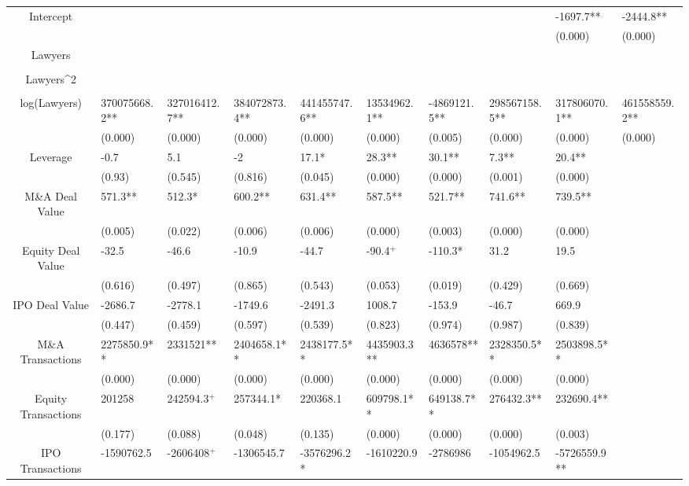 \documentclass{article}
\begin{document}
\begin{table}[H]
\begin{tabular}{|clllllllll|}
Intercept &  &  &  &  &  &  &  & -1697.7** & -2444.8** \\ 
   &  &  &  &  &  &  &  & (0.000) & (0.000) \\ 
  Lawyers &  &  &  &  &  &  &  &  &  \\ 
   &  &  &  &  &  &  &  &  &  \\ 
  Lawyers^2 &  &  &  &  &  &  &  &  &  \\ 
   &  &  &  &  &  &  &  &  &  \\ 
  log(Lawyers) & 370075668.2** & 327016412.7** & 384072873.4** & 441455747.6** & 13534962.1** & -4869121.5** & 298567158.5** & 317806070.1** & 461558559.2** \\ 
   & (0.000) & (0.000) & (0.000) & (0.000) & (0.000) & (0.005) & (0.000) & (0.000) & (0.000) \\ 
  Leverage & -0.7 & 5.1 & -2 & 17.1* & 28.3** & 30.1** & 7.3** & 20.4** &  \\ 
   & (0.93) & (0.545) & (0.816) & (0.045) & (0.000) & (0.000) & (0.001) & (0.000) &  \\ 
  M\&A Deal Value & 571.3** & 512.3* & 600.2** & 631.4** & 587.5** & 521.7** & 741.6** & 739.5** &  \\ 
   & (0.005) & (0.022) & (0.006) & (0.006) & (0.000) & (0.003) & (0.000) & (0.000) &  \\ 
  Equity Deal Value & -32.5 & -46.6 & -10.9 & -44.7 & -90.4$^{+}$ & -110.3* & 31.2 & 19.5 &  \\ 
   & (0.616) & (0.497) & (0.865) & (0.543) & (0.053) & (0.019) & (0.429) & (0.669) &  \\ 
  IPO Deal Value & -2686.7 & -2778.1 & -1749.6 & -2491.3 & 1008.7 & -153.9 & -46.7 & 669.9 &  \\ 
   & (0.447) & (0.459) & (0.597) & (0.539) & (0.823) & (0.974) & (0.987) & (0.839) &  \\ 
  M\&A Transactions & 2275850.9** & 2331521** & 2404658.1** & 2438177.5** & 4435903.3** & 4636578** & 2328350.5** & 2503898.5** &  \\ 
   & (0.000) & (0.000) & (0.000) & (0.000) & (0.000) & (0.000) & (0.000) & (0.000) &  \\ 
  Equity Transactions & 201258 & 242594.3$^{+}$ & 257344.1* & 220368.1 & 609798.1** & 649138.7** & 276432.3** & 232690.4** &  \\ 
   & (0.177) & (0.088) & (0.048) & (0.135) & (0.000) & (0.000) & (0.000) & (0.003) &  \\ 
  IPO Transactions & -1590762.5 & -2606408$^{+}$ & -1306545.7 & -3576296.2* & -1610220.9 & -2786986 & -1054962.5 & -5726559.9** &  \\ 

\end{tabular}
\end{table}
\end{document}
